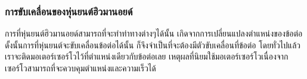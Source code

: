\subsubsection*{การขับเคลื่อนของหุ่นยนต์ฮิวมานอยด์}
การที่หุ่นยนต์ฮิวมานอยด์สามารถที่จะทำท่าทางต่างๆได้นั้น เกิดจากการเปลี่ยนแปลงตำแหน่งของข้อต่อ ดั้งนั้นการที่หุ่นยนต์จะขับเคลื่อนข้อต่อได้นั้น
ก็จึงจำเป็นที่จะต้องมีตัวขับเคลื่อนที่ข้อต่อ โดยทั่วไปแล้วเราจะติดมอเตอร์เซอร์โวไว้ที่ตำแหน่งเดียวกับข้อต่อเลย เหตุผลที่นิยมใช้มอเตอร์เซอร์โวเนื่องจาก
เซอร์โวสามารถที่จะควบคุมตำแหน่งและความเร็วได้


